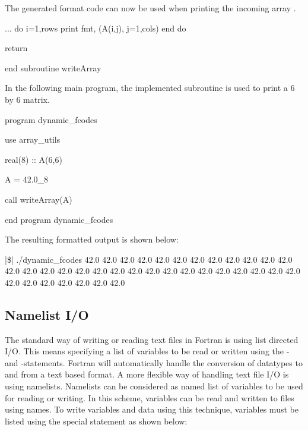 The generated format code can now be used when printing the incoming array .

\begin{fortrancodeenv}
	...
	do i=1,rows
		print fmt, (A(i,j), j=1,cols)
	end do
		
	return
	
end subroutine writeArray
\end{fortrancodeenv}

In the following main program, the implemented  subroutine is used to print a 6 by 6 matrix.

\begin{fortrancodeenv}
program dynamic_fcodes

	use array_utils

	real(8) :: A(6,6)
	
	A = 42.0_8
	
	call writeArray(A)
	
end program dynamic_fcodes
\end{fortrancodeenv}

The resulting formatted output is shown below:

\cmdmode

\begin{fortrancodeenv}
|\$| ./dynamic_fcodes
42.0    42.0    42.0    42.0    42.0    42.0
42.0    42.0    42.0    42.0    42.0    42.0
42.0    42.0    42.0    42.0    42.0    42.0
42.0    42.0    42.0    42.0    42.0    42.0
42.0    42.0    42.0    42.0    42.0    42.0
42.0    42.0    42.0    42.0    42.0    42.0
\end{fortrancodeenv}

\fmode

\subsection{Namelist I/O}

The standard way of writing or reading text files in Fortran is using list directed I/O. This means specifying a list of variables to be read or written using the - and -statements. Fortran will automatically handle the conversion of datatypes to and from a text based format. A more flexible way of handling text file I/O is using namelists. Namelists can be considered as named list of variables to be used for reading or writing. In this scheme, variables can be read and written to files using names. To write variables and data using this technique, variables must be listed using the special  statement as shown below:

